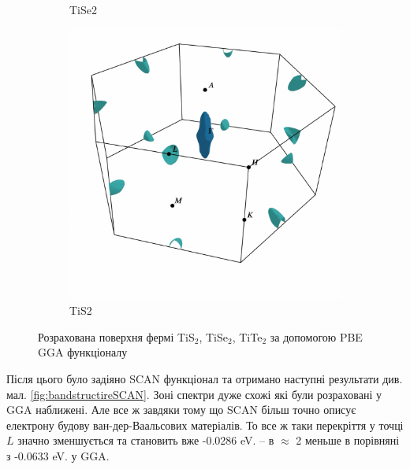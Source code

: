\begin{figure}[H]
\begin{subfigure}[b]{.4\textwidth}
    	\caption{
    	TiSe2}
	\end{subfigure}
	\begin{subfigure}[b]{.9\textwidth}
    	\includegraphics[width=\linewidth]{img/results/fstis2.pdf}
    	\caption{
    	TiS2}
	\end{subfigure}
\caption{Розрахована поверхня фермі TiS$_2$, TiSe$_2$, TiTe$_2$ за допомогою PBE GGA функціоналу}
\label{fig:fermisurf}
\end{figure}

Після цього було задіяно SCAN функціонал та отримано наступні результати див. мал. \ref{fig:bandstructireSCAN}. Зоні спектри дуже схожі які були розраховані у GGA наближені. Але все ж завдяки тому що SCAN більш точно описує електрону будову ван-дер-Ваальсових матеріалів. То все ж таки перекріття у точці $L$ значно зменшується та становить вже -0.0286 eV. -- в $\approx$ 2 меньше в порівняні з -0.0633 eV. у GGA. 

